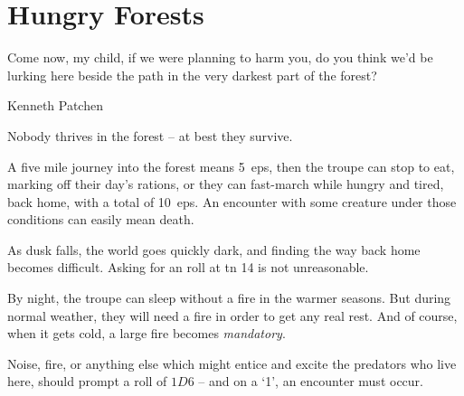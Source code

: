 \chapter{Hungry Forests}
\epigraph{Come now, my child, if we were planning to harm you, do you think we'd be lurking here beside the path in the very darkest part of the forest?}{Kenneth Patchen}

Nobody thrives in the forest -- at best they survive.

A five mile journey into the forest means 5~\glspl{ep}, then the troupe can stop to eat, marking off their day's rations, or they can fast-march while hungry and tired, back home, with a total of 10~\glspl{ep}.
An encounter with some creature under those conditions can easily mean death.

As dusk falls, the world goes quickly dark, and finding the way back home becomes difficult.
Asking for an  roll at \gls{tn} 14 is not unreasonable.

By night, the troupe can sleep without a fire in the warmer seasons.
But during normal weather, they will need a fire in order to get any real rest.
And of course, when it gets cold, a large fire becomes \emph{mandatory}.

Noise, fire, or anything else which might entice and excite the predators who live here, should prompt a roll of $1D6$ -- and on a `1', an encounter must occur.
